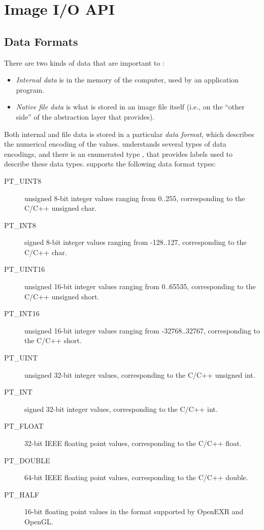 \chapter{Image I/O API}
\label{chap:imageioapi}



\section{Data Formats}
\label{sec:dataformats}
\label{sec:ParamBaseType}

There are two kinds of data that are important to \product:

\begin{itemize}
\item \emph{Internal data} is in the memory of the computer, used by an
  application program.
\item \emph{Native file data} is what is stored in an image file itself
  (i.e., on the ``other side'' of the abstraction layer that \product
  provides).
\end{itemize}

Both internal and file data is stored in a particular \emph{data
  format}, which describes the numerical encoding of the values.
\product understands several types of data encodings, and there
is an enumerated type \ParamBaseType, that provides labels used
to describe these data types.  \product supports the following 
data format types:

\begin{description}
\item[\halfspc\rm {\cf PT_UINT8}] unsigned 8-bit integer values ranging from
  0..255, corresponding to the C/C++ {\kw unsigned char}.
\item[\halfspc\rm {\cf PT_INT8}] signed 8-bit integer values ranging from
  -128..127, corresponding to the C/C++ {\kw char}.
\item[\halfspc\rm {\cf PT_UINT16}] unsigned 16-bit integer values ranging
  from 0..65535, corresponding to the C/C++ {\kw unsigned short}.
\item[\halfspc\rm {\cf PT_INT16}] unsigned 16-bit integer values ranging
  from -32768..32767, corresponding to the C/C++ {\kw short}.
\item[\halfspc\rm {\cf PT_UINT}] unsigned 32-bit integer values,
  corresponding to the C/C++ {\kw unsigned int}.
\item[\halfspc\rm {\cf PT_INT}] signed 32-bit integer values, corresponding
  to the C/C++ {\kw int}.
\item[\halfspc\rm {\cf PT_FLOAT}] 32-bit IEEE floating point values,
  corresponding to the C/C++ {\kw float}.
\item[\halfspc\rm {\cf PT_DOUBLE}] 64-bit IEEE floating point values,
  corresponding to the C/C++ {\kw double}.
\item[\halfspc\rm {\cf PT_HALF}] 16-bit floating point values in the format
  supported by OpenEXR and OpenGL.
\end{description}

